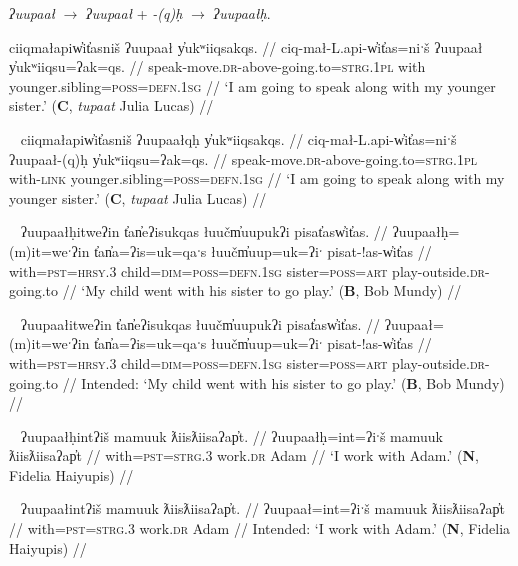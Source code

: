 \textit{ʔuupaał} $\rightarrow$ \textit{ʔuupaał} + \textit{-(q)ḥ} $\rightarrow$ \textit{ʔuupaałḥ}.

\ex \label{ex:uupaal1}
\begingl
\glpreamble ciiqmałapiw̓it̓asniš ʔuupaał y̓ukʷiiqsakqs. //
\gla ciq-mał-L.api-w̓it̓as=niˑš ʔuupaał y̓ukʷiiqsu=ʔak=qs. //
\glb speak-move.\textsc{dr}-above-going.to=\textsc{strg.1pl} with younger.sibling=\textsc{poss}=\textsc{defn.1sg} //
\glft `I am going to speak along with my younger sister.' (\textbf{C}, \textit{tupaat} Julia Lucas) //
\endgl
\xe

\ex~ \label{ex:uupaalqh1}
\begingl
\glpreamble ciiqmałapiw̓it̓asniš ʔuupaałqḥ y̓ukʷiiqsakqs. //
\gla ciq-mał-L.api-w̓it̓as=niˑš ʔuupaał-(q)ḥ y̓ukʷiiqsu=ʔak=qs. //
\glb speak-move.\textsc{dr}-above-going.to=\textsc{strg.1pl} with-\textsc{link} younger.sibling=\textsc{poss}=\textsc{defn.1sg} //
\glft `I am going to speak along with my younger sister.' (\textbf{C}, \textit{tupaat} Julia Lucas) //
\endgl
\xe

\ex~ \label{ex:uupaalh2}
\begingl
\glpreamble ʔuupaałḥitweʔin t̓an̓eʔisukqas łuučm̓uupukʔi pisat̓asw̓it̓as. //
\gla ʔuupaałḥ=(m)it=weˑʔin t̓an̓a=ʔis=uk=qaˑs łuučm̓uup=uk=ʔiˑ pisat-!as-w̓it̓as //
\glb with=\textsc{pst}=\textsc{hrsy.3} child=\textsc{dim}=\textsc{poss}=\textsc{defn.1sg} sister=\textsc{poss}=\textsc{art} play-outside.\textsc{dr}-going.to //
\glft `My child went with his sister to go play.' (\textbf{B}, Bob Mundy) //
\endgl
\xe

\ex~ \label{ex:*uupaal2}
\begingl
\glpreamble *ʔuupaałitweʔin t̓an̓eʔisukqas łuučm̓uupukʔi pisat̓asw̓it̓as. //
\gla ʔuupaał=(m)it=weˑʔin t̓an̓a=ʔis=uk=qaˑs łuučm̓uup=uk=ʔiˑ pisat-!as-w̓it̓as //
\glb with=\textsc{pst}=\textsc{hrsy.3} child=\textsc{dim}=\textsc{poss}=\textsc{defn.1sg} sister=\textsc{poss}=\textsc{art} play-outside.\textsc{dr}-going.to //
\glft Intended: `My child went with his sister to go play.' (\textbf{B}, Bob Mundy) //
\endgl
\xe

\ex~ \label{ex:uupaalh3}
\begingl
\glpreamble ʔuupaałḥintʔiš mamuuk ƛiisƛiisaʔap̓t. //
\gla ʔuupaałḥ=int=ʔiˑš mamuuk ƛiisƛiisaʔap̓t //
\glb with=\textsc{pst}=\textsc{strg.3} work.\textsc{dr} Adam //
\glft `I work with Adam.' (\textbf{N}, Fidelia Haiyupis) //
\endgl
\xe

\ex~ \label{ex:*uupaal3}
\begingl
\glpreamble *ʔuupaałintʔiš mamuuk ƛiisƛiisaʔap̓t. //
\gla ʔuupaał=int=ʔiˑš mamuuk ƛiisƛiisaʔap̓t //
\glb with=\textsc{pst}=\textsc{strg.3} work.\textsc{dr} Adam //
\glft Intended: `I work with Adam.' (\textbf{N}, Fidelia Haiyupis) //
\endgl
\xe

